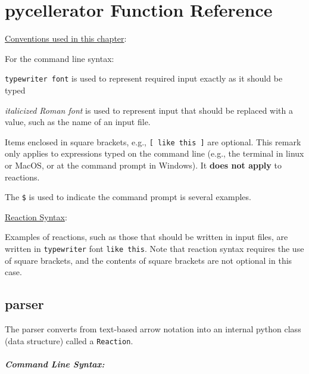 \chapter[Functions]{pycellerator Function Reference}

\underline{Conventions used in this chapter}: 

For the command line syntax:

{\tt typewriter font} is used to represent required input exactly as it should be typed

\textit{italicized Roman font} is used to represent input that should be replaced with a value, such as the name of an input file.

Items enclosed in square brackets, e.g., {\tt [ like this ]} are optional. This remark only applies to expressions typed on the command line (e.g., the terminal in linux or MacOS, or at the command prompt in Windows). It \textbf{does not apply} to reactions.

The {\tt \$} is used to indicate the command prompt is several examples. 

\underline{Reaction Syntax}: 

Examples of reactions, such as those that should be written in input files, are written in {\tt typewriter} font {\tt like this}. Note that reaction syntax requires the 
use of square brackets, and the contents of square brackets are not optional in this case. 


 
\section{parser}

The parser converts from text-based arrow notation into an internal python class (data structure) called a {\tt Reaction}.



\paragraph{Command Line Syntax:}\ \\


